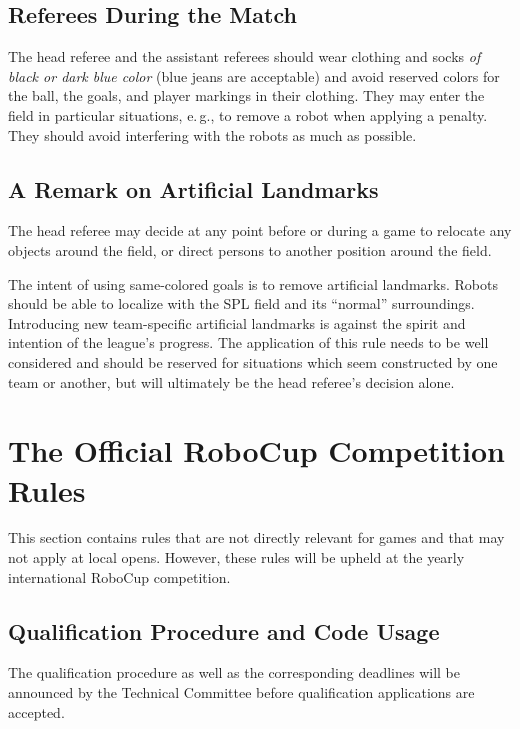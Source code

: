 \documentclass[12pt]{article}
\newcommand{\eg}{\mbox{e.\,g.}\xspace}
\begin{document}
\subsection{Referees During the Match}

The head referee and the assistant referees should wear clothing and socks \emph{of black or dark blue color} (blue jeans are acceptable) and avoid reserved colors for the ball, the goals, and player markings in their clothing. They may enter the field in particular situations, \eg, to remove a robot when applying a penalty. They should avoid interfering with the robots as much as possible.

\subsection{A Remark on Artificial Landmarks}
\label{sec:judgment:landmarks}

The head referee may decide at any point before or during a game to relocate any objects around the field, or direct persons to another position around the field.

The intent of using same-colored goals is to remove artificial landmarks.
Robots should be able to localize with the SPL field and its ``normal'' surroundings.
Introducing new team-specific artificial landmarks is against the spirit and intention of the league's progress.
The application of this rule needs to be well considered and should be reserved for situations which seem constructed by one team or another, but will ultimately be the head referee's decision alone.


\newpage


\appendix
\section{The Official RoboCup Competition Rules}
\label{sec:comRules}
This section contains rules that are not directly relevant for games and that may not apply at local opens.  However, these rules will be upheld at the yearly international RoboCup competition.

\subsection{Qualification Procedure and Code Usage}
\label{sec:qualification_procedure_codeuse}

The qualification procedure as well as the corresponding deadlines will be announced by the Technical Committee before qualification applications are accepted.
\end{document}
